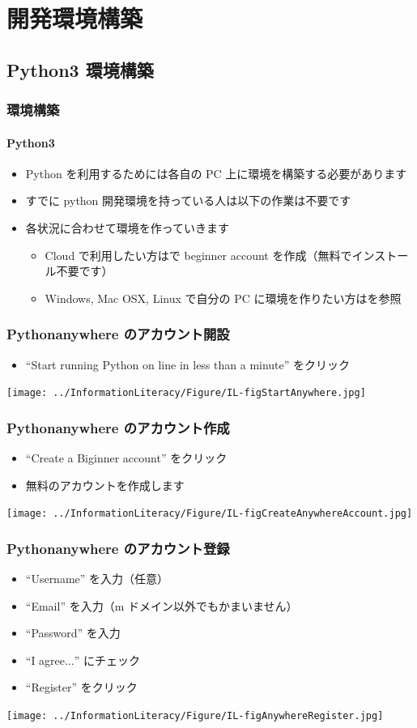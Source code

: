 \section{開発環境構築}
\subsection{Python3 環境構築}
\begin{frame}[shrink]
\frametitle{環境構築}
\framesubtitle{Python3}
  \begin{itemize}
\item Python を利用するためには各自の PC 上に環境を構築する必要があります
\item すでに python 開発環境を持っている人は以下の作業は不要です
\item 各状況に合わせて環境を作っていきます
    \begin{itemize}
\item Cloud で利用したい方は\href{https://www.pythonanywhere.com/}{}で beginner account を作成（無料でインストール不要です）
\item Windows, Mac OSX, Linux で自分の PC に環境を作りたい方は\href{https://www.python.jp/install/install.html}{}を参照
    \end{itemize}
  \end{itemize}
\end{frame}
\begin{frame}
\frametitle{Pythonanywhere のアカウント開設}
  \begin{itemize}
\item ``Start running Python on line in less than a minute'' をクリック
  \end{itemize}
\texttt{[image: ../InformationLiteracy/Figure/IL-figStartAnywhere.jpg]}
\end{frame}
\begin{frame}
\frametitle{Pythonanywhere のアカウント作成}
  \begin{itemize}
\item ``Create a Biginner account'' をクリック
\item 無料のアカウントを作成します
  \end{itemize}
\texttt{[image: ../InformationLiteracy/Figure/IL-figCreateAnywhereAccount.jpg]}
\end{frame}
\begin{frame}
\frametitle{Pythonanywhere のアカウント登録}
  \begin{itemize}
\item ``Username'' を入力（任意）
\item ``Email'' を入力（m ドメイン以外でもかまいません）
\item ``Password'' を入力
\item ``I agree$\ldots$'' にチェック
\item ``Register'' をクリック
  \end{itemize}
\texttt{[image: ../InformationLiteracy/Figure/IL-figAnywhereRegister.jpg]}
\end{frame}
